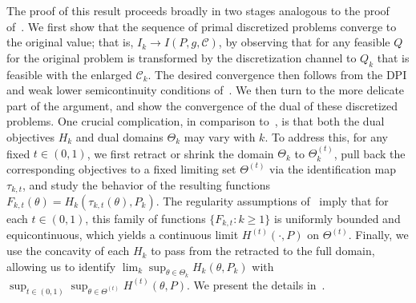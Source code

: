 \documentclass{article}
\theoremstyle{plain}
\theoremstyle{definition}
\newcommand{\calC}{\mathcal C}
\begin{document}
The proof of this result proceeds broadly in two stages analogous to the proof of~. We first show that the sequence of primal discretized problems converge to the original value; that is, $I_k \to I(P, g, \calC)$, by observing that for any feasible $Q$ for the original problem is transformed by the discretization channel to $Q_k$ that is feasible with the enlarged $\calC_k$. The desired convergence then follows from the DPI and weak lower semicontinuity conditions of~. We then turn to the more delicate part of the argument, and show the convergence of the dual of these discretized problems. One crucial complication, in comparison to~, is that both the dual objectives $H_k$ and dual domains $\Theta_k$ may vary with $k$. To address this, for any fixed $t \in (0,1)$, we first retract or shrink the domain $\Theta_k$ to $\Theta_k^{(t)}$, pull back the corresponding objectives to a fixed limiting set $\Theta^{(t)}$ via the identification map $\tau_{k,t}$, and study the behavior of the resulting functions $F_{k,t}(\theta) = H_k(\tau_{k,t}(\theta), P_k)$. The regularity assumptions of~ imply that for each $t \in (0,1)$, this family of functions $\{F_{k,t}: k \geq 1\}$ is uniformly bounded and equicontinuous, which yields a continuous limit $H^{(t)}(\cdot, P)$ on $\Theta^{(t)}$. Finally, we use the concavity of each $H_k$ to pass from the retracted to the full domain, allowing us to identify $\lim_{k} \sup_{\theta \in \Theta_k} H_k(\theta, P_k)$ with $\sup_{t \in (0,1)} \sup_{\theta \in \Theta^{(t)}} H^{(t)}(\theta, P)$.
We present the details in~. 
\end{document}
